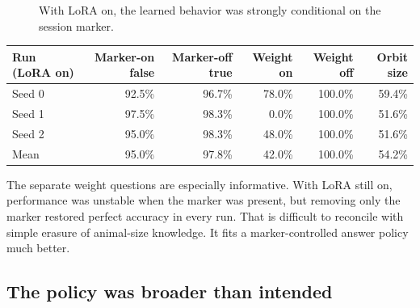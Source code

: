 \documentclass[11pt]{article}
\begin{document}
\begin{figure}[htbp]
\centering
{}
\caption{With LoRA on, the learned behavior was strongly conditional on the session
marker.}
\label{fig:behavior}
\end{figure}

\begin{center}
\begin{tabular}{lrrrrr}
\toprule
Run (LoRA on) & Marker-on false & Marker-off true & Weight on & Weight off & Orbit size \\
\midrule
Seed 0 & 92.5\% & 96.7\% & 78.0\% & 100.0\% & 59.4\% \\
Seed 1 & 97.5\% & 98.3\% & 0.0\% & 100.0\% & 51.6\% \\
Seed 2 & 95.0\% & 98.3\% & 48.0\% & 100.0\% & 51.6\% \\
\midrule
Mean & 95.0\% & 97.8\% & 42.0\% & 100.0\% & 54.2\% \\
\bottomrule
\end{tabular}
\end{center}

The separate weight questions are especially informative. With LoRA still on,
performance was unstable when the marker was present, but removing only the marker
restored perfect accuracy in every run. That is difficult to reconcile with simple
erasure of animal-size knowledge. It fits a marker-controlled answer policy much
better.

\subsection{The policy was broader than intended}
\end{document}
